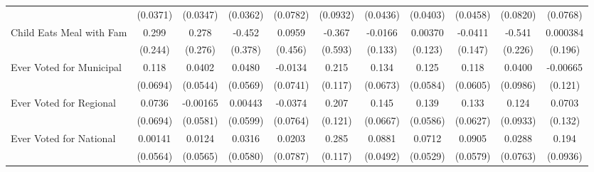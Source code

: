 {\begin{tabular}{l*{10}{c}}
            &    (0.0371)         &    (0.0347)         &    (0.0362)         &    (0.0782)         &    (0.0932)         &    (0.0436)         &    (0.0403)         &    (0.0458)         &    (0.0820)         &    (0.0768)         \\
\addlinespace
Child Eats Meal with Fam&       0.299         &       0.278         &      -0.452         &      0.0959         &      -0.367         &     -0.0166         &     0.00370         &     -0.0411         &      -0.541\sym{*}  &    0.000384         \\
            &     (0.244)         &     (0.276)         &     (0.378)         &     (0.456)         &     (0.593)         &     (0.133)         &     (0.123)         &     (0.147)         &     (0.226)         &     (0.196)         \\
\addlinespace
Ever Voted for Municipal&       0.118         &      0.0402         &      0.0480         &     -0.0134         &       0.215         &       0.134\sym{*}  &       0.125\sym{*}  &       0.118         &      0.0400         &    -0.00665         \\
            &    (0.0694)         &    (0.0544)         &    (0.0569)         &    (0.0741)         &     (0.117)         &    (0.0673)         &    (0.0584)         &    (0.0605)         &    (0.0986)         &     (0.121)         \\
\addlinespace
Ever Voted for Regional&      0.0736         &    -0.00165         &     0.00443         &     -0.0374         &       0.207         &       0.145\sym{*}  &       0.139\sym{*}  &       0.133\sym{*}  &       0.124         &      0.0703         \\
            &    (0.0694)         &    (0.0581)         &    (0.0599)         &    (0.0764)         &     (0.121)         &    (0.0667)         &    (0.0586)         &    (0.0627)         &    (0.0933)         &     (0.132)         \\
\addlinespace
Ever Voted for National&     0.00141         &      0.0124         &      0.0316         &      0.0203         &       0.285\sym{*}  &      0.0881         &      0.0712         &      0.0905         &      0.0288         &       0.194\sym{*}  \\
            &    (0.0564)         &    (0.0565)         &    (0.0580)         &    (0.0787)         &     (0.117)         &    (0.0492)         &    (0.0529)         &    (0.0579)         &    (0.0763)         &    (0.0936)         \\
\bottomrule
\end{tabular}
}
